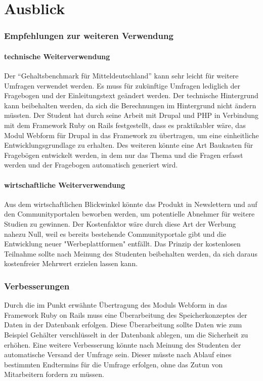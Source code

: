 \part{Ausblick}
\section{Empfehlungen zur weiteren Verwendung}
\subsection{technische Weiterverwendung}
\label{sec:ausblick_technik}
Der ``Gehaltsbenchmark für Mitteldeutschland'' kann sehr leicht für weitere Umfragen verwendet werden. Es muss für zukünftige Umfragen lediglich der Fragebogen und der Einleitungstext geändert werden.
Der technische Hintergrund kann beibehalten werden, da sich die Berechnungen im Hintergrund nicht ändern müssten. Der Student hat durch seine Arbeit mit Drupal und PHP in Verbindung mit dem Framework Ruby on Rails festgestellt, dass es praktikabler wäre, das Modul Webform für Drupal in das Framework zu übertragen, um eine einheitliche Entwicklungsgrundlage zu erhalten. Des weiteren könnte eine Art Baukasten für Fragebögen entwickelt werden, in dem nur das Thema und die Fragen erfasst werden und der Fragebogen automatisch generiert wird. 
\subsection{wirtschaftliche Weiterverwendung}
Aus dem wirtschaftlichen Blickwinkel könnte das Produkt in Newslettern und auf den Communityportalen beworben werden, um potentielle Abnehmer für weitere Studien zu gewinnen. Der Kostenfaktor wäre durch diese Art der Werbung nahezu Null, weil es bereits bestehende Communityportale gibt und die Entwicklung neuer "Werbeplattformen" entfällt. Das Prinzip der kostenlosen Teilnahme sollte nach Meinung des Studenten beibehalten werden, da sich daraus kostenfreier Mehrwert erzielen lassen kann. 
\section{Verbesserungen}
Durch die im Punkt  erwähnte Übertragung des Moduls Webform in das Framework Ruby on Rails muss eine Überarbeitung des Speicherkonzeptes der Daten in der Datenbank erfolgen. Diese Überarbeitung sollte Daten wie zum Beispiel Gehälter verschlüsselt in der Datenbank ablegen, um die Sicherheit zu erhöhen. Eine weitere Verbesserung könnte nach Meinung des Studenten der automatische Versand der Umfrage sein. Dieser müsste nach Ablauf eines bestimmten Endtermins für die Umfrage erfolgen, ohne das Zutun von Mitarbeitern fordern zu müssen.
